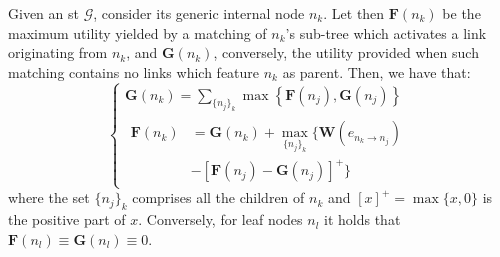 %

\begin{lem}
\label{lemma_utils}
Given an \gls{st} $\mathcal{G}$, consider its generic internal node $n_k$. Let then $\mathbf{F}(n_k)$ be the maximum utility yielded by a matching of $n_k$'s sub-tree which activates a link originating from $n_k$, and $\mathbf{G}(n_k)$, conversely, the utility provided when such matching contains no links which feature $n_k$ as parent. Then, we have that:
\[ 
\begin{cases}
\mathbf{G}(n_k) = \sum\limits_{ \{ n_j \}_k} \max \left\{ \mathbf{F}(n_j), \mathbf{G}(n_j) \right\} \\

\begin{aligned}
\mathbf{F}(n_k) &= \mathbf{G}(n_k) + \underset{\{ n_j \}_k }{\max} \{ \mathbf{W} ( e_{n_k \to n_j} ) \\
&- \left[ \mathbf{F}(n_j) - \mathbf{G}(n_j) \right]^+ \}
\end{aligned}


\end{cases}
\]
where the set $\{ n_j \}_k$ comprises all the children of $n_k$ and $\left[ x \right]^+ = \max\{x, 0\}$ is the positive part of $x$.
%
Conversely, for leaf nodes $n_l$ it holds that $\mathbf{F}(n_l) \equiv \mathbf{G}(n_l) \equiv 0 $.
\end{lem}

